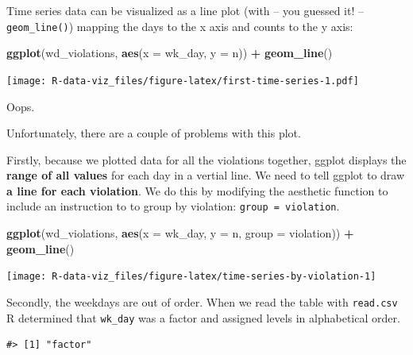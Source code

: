 \documentclass[]{book}
\newenvironment{Shaded}{\begin{snugshade}}{\end{snugshade}}
\newcommand{\KeywordTok}[1]{\textcolor[rgb]{0.13,0.29,0.53}{\textbf{#1}}}
\newcommand{\DataTypeTok}[1]{\textcolor[rgb]{0.13,0.29,0.53}{#1}}
\newcommand{\StringTok}[1]{\textcolor[rgb]{0.31,0.60,0.02}{#1}}
\newcommand{\OperatorTok}[1]{\textcolor[rgb]{0.81,0.36,0.00}{\textbf{#1}}}
\newcommand{\NormalTok}[1]{#1}
\theoremstyle{definition}
\theoremstyle{definition}
\theoremstyle{definition}
\theoremstyle{remark}
\begin{document}
Time series data can be visualized as a line plot (with -- you guessed
it! -- \texttt{geom\_line()}) mapping the days to the x axis and counts
to the y axis:

\begin{Shaded}
\begin{Highlighting}[]
\KeywordTok{ggplot}\NormalTok{(wd_violations, }\KeywordTok{aes}\NormalTok{(}\DataTypeTok{x =}\NormalTok{ wk_day, }\DataTypeTok{y =}\NormalTok{ n)) }\OperatorTok{+}
\StringTok{  }\KeywordTok{geom_line}\NormalTok{()}
\end{Highlighting}
\end{Shaded}

\texttt{[image: R-data-viz\_files/figure-latex/first-time-series-1.pdf]}

Oops.

Unfortunately, there are a couple of problems with this plot.

Firstly, because we plotted data for all the violations together, ggplot
displays the \textbf{range of all values} for each day in a vertial
line. We need to tell ggplot to draw \textbf{a line for each violation}.
We do this by modifying the aesthetic function to include an instruction
to to group by violation: \texttt{group\ =\ violation}.

\begin{Shaded}
\begin{Highlighting}[]
\KeywordTok{ggplot}\NormalTok{(wd_violations, }\KeywordTok{aes}\NormalTok{(}\DataTypeTok{x =}\NormalTok{ wk_day, }\DataTypeTok{y =}\NormalTok{ n, }\DataTypeTok{group =}\NormalTok{ violation)) }\OperatorTok{+}
\StringTok{  }\KeywordTok{geom_line}\NormalTok{()}
\end{Highlighting}
\end{Shaded}

\texttt{[image: R-data-viz\_files/figure-latex/time-series-by-violation-1]}

Secondly, the weekdays are out of order. When we read the table with
\texttt{read.csv} R determined that \texttt{wk\_day} was a factor and
assigned levels in alphabetical order.

\begin{Shaded}
\end{Shaded}

\begin{verbatim}
#> [1] "factor"
\end{verbatim}
\end{document}
